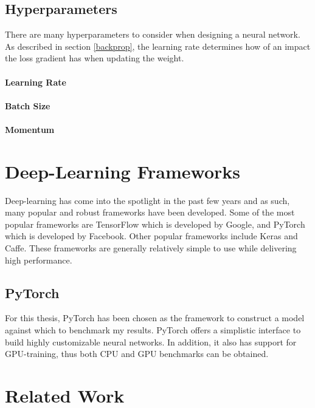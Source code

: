 \subsection{Hyperparameters}
There are many hyperparameters to consider when designing a neural network. As described in section \ref{backprop}, the learning rate determines how of an impact the loss gradient has when updating the weight. 
\paragraph{Learning Rate}

\paragraph{Batch Size}

\paragraph{Momentum}




\section{Deep-Learning Frameworks}
Deep-learning has come into the spotlight in the past few years and as such, many popular and robust frameworks have been developed. Some of the most popular frameworks are TensorFlow which is developed by Google, and PyTorch which is developed by Facebook. Other popular frameworks include Keras and Caffe. These frameworks are generally relatively simple to use while delivering high performance. 


\subsection{PyTorch}
For this thesis, PyTorch has been chosen as the framework to construct a model against which to benchmark my results. PyTorch offers a simplistic interface to build highly customizable neural networks. In addition, it also has support for GPU-training, thus both CPU and GPU benchmarks can be obtained.

\section{Related Work}